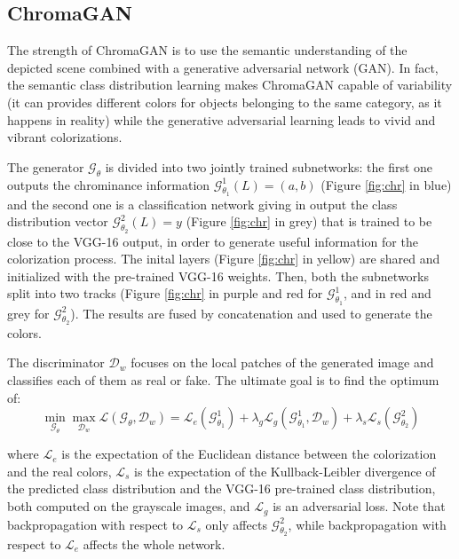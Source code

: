\subsection{ChromaGAN}
The strength of ChromaGAN is to use the semantic understanding of the depicted scene combined with a generative adversarial network (GAN). In fact, the semantic class distribution learning makes ChromaGAN capable of variability (it can provides different colors for objects belonging to the same category, as it happens in reality) while the generative adversarial learning leads to vivid and vibrant colorizations.

The generator $\mathcal{G}_\theta$ is divided into two jointly trained subnetworks: the first one outputs the chrominance information $\mathcal{G}_{\theta_1}^1(L) = (a,b)$ (Figure \ref{fig:chr} in blue) and the second one is a classification network giving in output the class distribution vector $\mathcal{G}_{\theta_2}^2(L)=y$ (Figure \ref{fig:chr} in grey) that is trained to be close to the VGG-16 output, in order to generate useful information for the colorization process. The inital layers (Figure \ref{fig:chr} in yellow) are shared and initialized with the pre-trained VGG-16 weights. Then, both the subnetworks split into two tracks (Figure \ref{fig:chr} in purple and red for $\mathcal{G}_{\theta_1}^1$, and in red and grey for $\mathcal{G}_{\theta_2}^2$). The results are fused by concatenation and used to generate the colors.

The discriminator $\mathcal{D}_w$ focuses on the local patches of the generated image and classifies each of them as real or fake. The ultimate goal is to find the optimum of:
\begin{equation*}
	\min_{\mathcal{G}_\theta}\max_{\mathcal{D}_w} \mathcal{L}(\mathcal{G}_\theta, \mathcal{D}_w) = \mathcal{L}_e(\mathcal{G}^1_{\theta_1}) + \lambda_g\mathcal{L}_g(\mathcal{G}^1_{\theta_1},\mathcal{D}_w) + \lambda_s\mathcal{L}_s(\mathcal{G}^2_{\theta_2})
\end{equation*} 

where $\mathcal{L}_e$ is the expectation of the Euclidean distance between the colorization and the real colors, $\mathcal{L}_s$ is the expectation of the Kullback-Leibler divergence of the predicted class distribution and the VGG-16 pre-trained class distribution, both computed on the grayscale images, and $\mathcal{L}_g$ is an adversarial loss. Note that backpropagation with respect to $\mathcal{L}_s$ only affects $\mathcal{G}_{\theta_2}^2$, while backpropagation with respect to $\mathcal{L}_e$ affects the whole network.